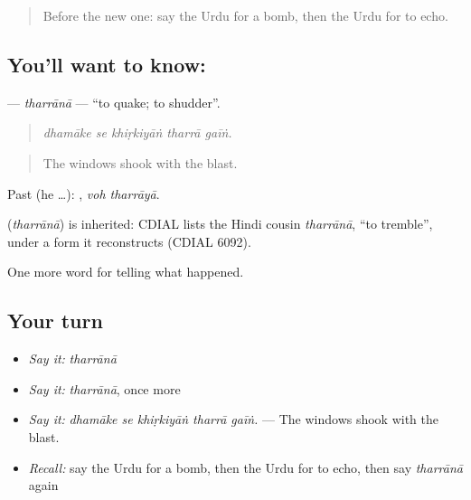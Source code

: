\label{lesson:UR-C306-tharrana}



\begin{quote}
Before the new one: say the Urdu for a bomb, then the Urdu for to echo.
\end{quote}

\subsection*{You'll want to know: }
\textbf{} — \emph{tharrānā} — \textquotedblleft{}to quake; to shudder\textquotedblright{}.

\begin{quote}
    
\end{quote}

\begin{quote}
\emph{dhamāke se khiṛkiyāṅ tharrā gaīṅ.}
\end{quote}

\begin{quote}
The windows shook with the blast.
\end{quote}

Past (he …):  , \emph{voh tharrāyā}.

\begin{cousinweb}
\textbf{} (\emph{tharrānā}) is inherited: CDIAL lists the Hindi cousin \emph{tharrānā}, \textquotedblleft{}to tremble\textquotedblright{}, under a form it reconstructs (CDIAL 6092).
\end{cousinweb}

\begin{grammarlens}[title={What you've built}]
One more word for telling what happened.
\end{grammarlens}

\subsection*{Your turn}
\begin{itemize}
\raggedright
  \item \emph{Say it:} \emph{tharrānā}
  \item \emph{Say it:} \emph{tharrānā}, once more
  \item \emph{Say it:} \emph{dhamāke se khiṛkiyāṅ tharrā gaīṅ.} — The windows shook with the blast.
  \item \emph{Recall:} say the Urdu for a bomb, then the Urdu for to echo, then say \emph{tharrānā} again
\end{itemize}

